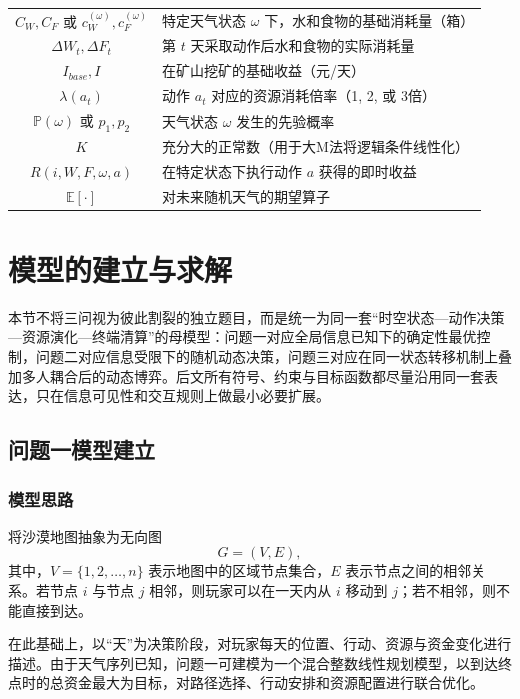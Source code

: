 \documentclass[UTF8,a4paper,12pt]{ctexart}
\begin{document}
\begin{table}[H]
\begin{tabular}{cl}
        $C_W, C_F$ 或 $c_W^{(\omega)}, c_F^{(\omega)}$ & 特定天气状态 $\omega$ 下，水和食物的基础消耗量（箱）  \\
        $\Delta W_t, \Delta F_t$ & 第 $t$ 天采取动作后水和食物的实际消耗量  \\
        $I_{base}, I$ & 在矿山挖矿的基础收益（元/天）  \\
        $\lambda(a_t)$ & 动作 $a_t$ 对应的资源消耗倍率（1, 2, 或 3倍） \\
        $\mathbb{P}(\omega)$ 或 $p_1, p_2$ & 天气状态 $\omega$ 发生的先验概率  \\
        $K$ & 充分大的正常数（用于大M法将逻辑条件线性化）  \\
        $R(i, W, F, \omega, a)$ & 在特定状态下执行动作 $a$ 获得的即时收益  \\
        $\mathbb{E}[\cdot]$ & 对未来随机天气的期望算子  \\
        \bottomrule
    \end{tabular}
\end{table}
\clearpage
\section{模型的建立与求解}
本节不将三问视为彼此割裂的独立题目，而是统一为同一套“时空状态—动作决策—资源演化—终端清算”的母模型：问题一对应全局信息已知下的确定性最优控制，问题二对应信息受限下的随机动态决策，问题三对应在同一状态转移机制上叠加多人耦合后的动态博弈。后文所有符号、约束与目标函数都尽量沿用同一套表达，只在信息可见性和交互规则上做最小必要扩展。

\subsection{问题一模型建立}


\subsubsection{模型思路}

将沙漠地图抽象为无向图
\[
G=(V,E),
\]
其中，$V=\{1,2,\dots,n\}$ 表示地图中的区域节点集合，$E$ 表示节点之间的相邻关系。若节点 $i$ 与节点 $j$ 相邻，则玩家可以在一天内从 $i$ 移动到 $j$；若不相邻，则不能直接到达。

在此基础上，以“天”为决策阶段，对玩家每天的位置、行动、资源与资金变化进行描述。由于天气序列已知，问题一可建模为一个混合整数线性规划模型，以到达终点时的总资金最大为目标，对路径选择、行动安排和资源配置进行联合优化。
\end{document}
